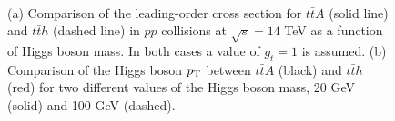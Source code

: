 \documentclass[preprintnumbers,superscriptaddress,nofootinbib,aps,prd,floatfix]{revtex4}
\newcommand{\pt}{p_{\rm{T}}}
\newcommand{\ttbar}{\ensuremath{t\bar{t}}}
\begin{document}
\begin{figure}[htbp]
\begin{center}
 \\
\caption{\small {(a) Comparison of the leading-order cross section for $\ttbar A$ (solid line) and 
$\ttbar h$ (dashed line) in $pp$ collisions at $\sqrt{s}=14$ TeV as a function of Higgs boson mass.
In both cases a value of $g_t = 1$ is assumed. (b) Comparison of the Higgs boson $\pt$ between 
$\ttbar A$ (black) and $\ttbar h$ (red) for two different values of the Higgs boson mass, 20 GeV (solid) and 100 GeV (dashed).}}
\label{fig:xsect_pTA_ttA} 
\end{center}
\end{figure}
\end{document}
